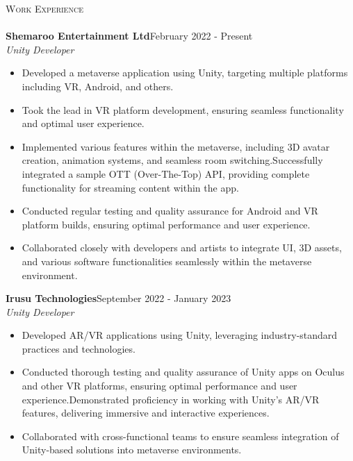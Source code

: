 \documentclass[a4paper]{article}
\newcommand{\lineunder} {
    \vspace*{-8pt} \\
    \hspace*{-18pt} \hrulefill \\
}
\newcommand{\header} [1] {
    {\hspace*{-18pt}\vspace*{6pt} \textsc{#1}}
    \vspace*{-6pt} \lineunder
}
\begin{document}
\header{Work Experience}
\vspace{0mm}
\textbf{Shemaroo Entertainment Ltd}\hfill February 2022 - Present\\
{\textit {Unity Developer}} 
\vspace{-2.5mm}
\begin{itemize} 
	\item Developed a metaverse application using Unity, targeting multiple platforms including VR, Android, and others.
 \vspace{-2.5mm}
        \item Took the lead in VR platform development, ensuring seamless functionality and optimal user experience.
 \vspace{-2.5mm}
        \item Implemented various features within the metaverse, including 3D avatar creation, animation systems, and seamless room switching.Successfully integrated a sample OTT (Over-The-Top) API, providing complete functionality for streaming content within the app.
 \vspace{-2.5mm}
        \item Conducted regular testing and quality assurance for Android and VR platform builds, ensuring optimal performance and user experience.
 \vspace{-2.5mm}
        \item Collaborated closely with developers and artists to integrate UI, 3D assets, and various software functionalities seamlessly within the metaverse environment.
\end{itemize}
\textbf{Irusu Technologies}\hfill September 2022 - January 2023\\
{\textit {Unity Developer}} 
\vspace{-2.5mm}
\begin{itemize} 
	\item Developed AR/VR applications using Unity, leveraging industry-standard practices and technologies.
 \vspace{-2.5mm}
        \item Conducted thorough testing and quality assurance of Unity apps on Oculus and other VR platforms, ensuring optimal performance and user experience.Demonstrated proficiency in working with Unity's AR/VR features, delivering immersive and interactive experiences.
 \vspace{-2.5mm}
        \item Collaborated with cross-functional teams to ensure seamless integration of Unity-based solutions into metaverse environments.
\end{itemize}
\end{document}
